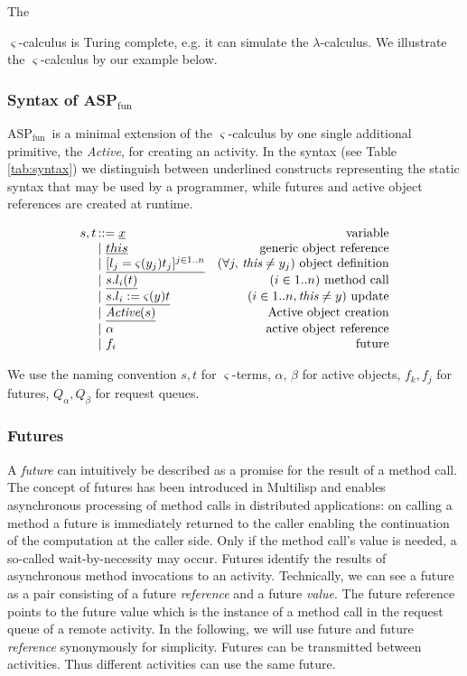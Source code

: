 \documentclass[10pt, conference, compsocconf]{IEEEtran}
\newcommand\aspfun{ASP${}_\text{fun}$\ }
\newcommand\aspfunp{ASP${}_\text{fun}$}
\newcommand{\symb}[1]{\makebox{\it #1}}
\begin{document}
The {$\varsigma$-calculus is Turing complete, e.g. it can simulate the $\lambda$-calculus. 
We illustrate the $\varsigma$-calculus by our example below.

\subsubsection{Syntax of \aspfunp}
\aspfun is a minimal extension of the $\varsigma$-calculus by one single 
additional primitive, the {\it Active}, for creating an activity.
In the syntax (see Table \ref{tab:syntax}) we distinguish between underlined constructs 
representing the static syntax that may be used by a programmer, while futures and active 
object references are created at runtime.
\begin{table}[!ht]
\[
\begin{array}{l@{\,}lr}
s,t & ::= \underline{ x} &\text{variable}\\
&|~ \underline{this} & \text{ generic object reference}\\
&|~ \underline{[l_j = \varsigma(y_j)t_j]^{j\in1..n}}&(\forall j,\,\symb{this}\neq y_j)\text{ object definition}\\
&|~\underline{s.l_i(t)} &(i \in1..n) \text{ method call}\\
&|~\underline{s.l_i:=\varsigma(y)t} &(i \in 1..n, \symb{this} \neq y)\text{ update}\\
&|~\underline{\symb{Active}(s)}& \text{ Active object creation}\\
&|~\alpha&\text{ active object reference}\\
&|~f_i&\text{ future}
\end{array}
\]
\vspace{-3ex}
\caption{\aspfun syntax}
\label{tab:syntax}
\vspace{-3ex}
\end{table}
We use the naming convention $s, t$ for $\varsigma$-terms, $\alpha$,
$\beta$ for active objects, $f_k, f_j$ for futures, $Q_\alpha, Q_\beta$ for request queues.


\subsubsection{Futures}
A {\it future} can intuitively be described as a promise for the result of a method call.
The concept of futures has been introduced in Multilisp \cite{Halstead85} and 
enables asynchronous processing of method calls in distributed applications:
on calling a method a future is immediately returned to the caller enabling the
continuation of the computation at the caller side. Only if the method call's value
is needed, a so-called wait-by-necessity may occur.
Futures identify the results of asynchronous method invocations to an
activity. Technically, we can see a future as a pair consisting of a future {\it reference} and a future {\it value}.
The future reference points to the future value which is the instance
of a method call in the request queue of a remote activity. 
In the following, we will use future and future {\it reference} synonymously for simplicity.
Futures can be transmitted between activities. Thus different activities 
can use the same future. 


}
\end{document}

